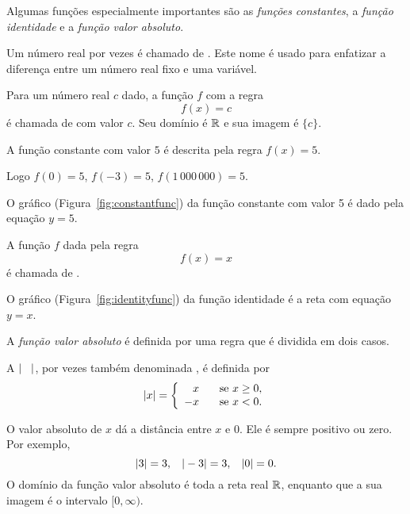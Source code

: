 \documentclass{svmono}
\begin{document}

Algumas funções especialmente importantes são as \emph{funções
constantes}, a \emph{função identidade} e a \emph{função valor
absoluto}.

Um número real por vezes é chamado de . Este
nome é usado para enfatizar a diferença entre um número real
fixo e uma variável.

Para um número real $c$ dado, a função $f$ com a regra
\[
  f(x) = c
\]
é chamada de  com
valor $c$. Seu domínio é $\mathbb{R}$ e sua imagem é $\{c\}$.

\begin{example}
\label{ex:constantfunc}
A função constante com valor $5$ é descrita pela regra $f(x) = 5.$

Logo \SPC $f(0) = 5$, \SPC $f(-3) = 5$, \SPC $f(1\,000\,000) = 5$.

O gráfico (Figura~\ref{fig:constantfunc}) da função constante com
valor 5 é dado pela equação $y=5$.
\end{example}

\begin{example}
\label{ex:identityfunc}
A função $f$ dada pela regra
\[
  f(x) = x
\]
é chamada de .

O gráfico (Figura~\ref{fig:identityfunc}) da função identidade é a
reta com equação $y=x$.
\end{example}


A \emph{função valor absoluto} é definida por uma regra que é
dividida em dois casos.

\begin{defin}
A  $|\hspace{2ex}|$,
por vezes também denominada , é
definida por
\[
  |x| = \left\{
        \begin{array}{rl}
         x & \hspace{2ex} \text{se } x \ge 0,\\
        -x & \hspace{2ex} \text{se } x < 0.
        \end{array}
        \right.
\]
\end{defin}

O valor absoluto de $x$ dá a distância entre $x$ e $0$. Ele
é sempre positivo ou zero. Por exemplo,
\[
  |3| = 3, \hspace{2ex} |-3| = 3, \hspace{2ex} |0| = 0.
\]
O domínio da função valor absoluto é toda a reta real $\mathbb{R}$,
enquanto que a sua imagem é o intervalo $[0,\infty)$.
\end{document}
